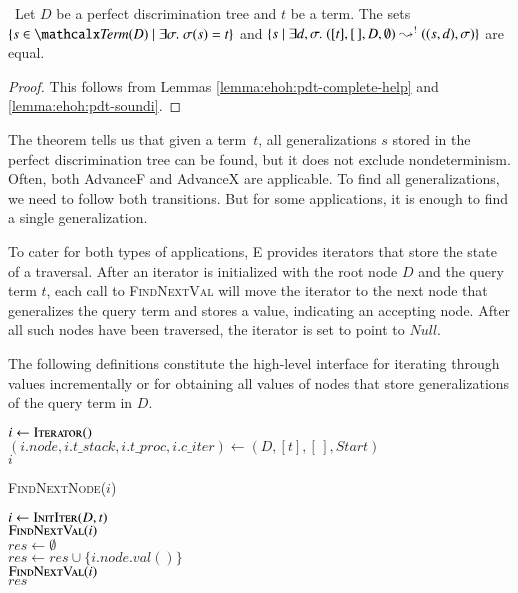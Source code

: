 \begin{theorem}\label{theorem:ehoh:pdt-complete}\,%
  Let $D$ be a perfect discrimination tree and $t$ be a term.
  The sets $\{ s \in \Term(D) \mid \exists \sigma.\; \sigma(s) = t \}$
  and $\{ s \mid \exists d, \sigma.\; ([t], [\,], D, \emptyset) \allowbreak
  \leadsto^! ((s, d), \sigma) \}$ are equal.
\end{theorem}
\begin{proof}
  This follows from Lemmas \ref{lemma:ehoh:pdt-complete-help} and \ref{lemma:ehoh:pdt-soundi}.
\end{proof}

The theorem tells us that given a term~$t$, all generalizations $s$ stored
in the perfect discrimination tree can be found, but it does not exclude
nondeterminism. Often, both \textsf{AdvanceF} and \textsf{AdvanceX} are
applicable. To find all generalizations, we need to follow both transitions.
But for some applications, it is enough to find a single generalization.

To cater for both types of applications, E provides iterators that store the
state of a traversal. After an iterator is initialized
with the root node $D$ and the query term $t$, each call to
\textsc{FindNextVal} will move the iterator to the next node that generalizes
the query term and stores a value, indicating an accepting node. After all
such nodes have been traversed, the iterator is set to point to
$\mathit{Null}$.

The following definitions constitute the high-level interface for
iterating through values incrementally or for obtaining all values of nodes that
store generalizations of the query term in $D$.


\begin{quotex}
  \q $i \gets \textsc{Iterator}()$ \\
  \q $(i.\mathit{node}, i.\mathit{t\_stack}, i.\mathit{t\_proc}, i.\mathit{c\_iter}) \gets (D, [t], [\,], \textit{Start})$ \\
  \q \MyReturn $i$
  
  \jot
  
  \q \MyDo
  \qq \textsc{FindNextNode}($i$) \\
  \q {}
  
  \jot
  
  \q $\mathit{i} \gets \textsc{InitIter}(D, t)$ \\
  \q $\textsc{FindNextVal}(i)$ \\
  \q $\mathit{res} \gets \emptyset$ \\
  \q {}
  \qq $\mathit{res} \gets \mathit{res} \cup \{ \mathit{i.node.val()} \}$ \\
  \qq $\textsc{FindNextVal}(i)$
  \\[\jot]
  \q \MyReturn $\mathit{res}$
  \end{quotex}
  
